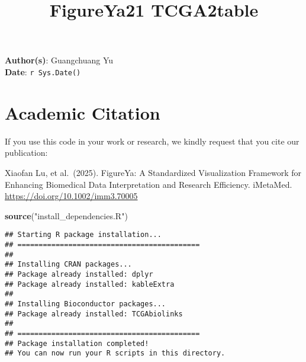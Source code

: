 \documentclass[
]{article}
\title{FigureYa21 TCGA2table}
\author{}
\date{\vspace{-2.5em}}
\newenvironment{Shaded}{\begin{snugshade}}{\end{snugshade}}
\newcommand{\FunctionTok}[1]{\textcolor[rgb]{0.13,0.29,0.53}{\textbf{#1}}}
\newcommand{\NormalTok}[1]{#1}
\newcommand{\StringTok}[1]{\textcolor[rgb]{0.31,0.60,0.02}{#1}}
\begin{document}
\maketitle

\textbf{Author(s)}: Guangchuang Yu\\
\textbf{Date}: \texttt{r\ Sys.Date()}

\section{Academic Citation}\label{academic-citation}

If you use this code in your work or research, we kindly request that
you cite our publication:

Xiaofan Lu, et al.~(2025). FigureYa: A Standardized Visualization
Framework for Enhancing Biomedical Data Interpretation and Research
Efficiency. iMetaMed. \url{https://doi.org/10.1002/imm3.70005}

\begin{Shaded}
\begin{Highlighting}[]
\FunctionTok{source}\NormalTok{(}\StringTok{"install\_dependencies.R"}\NormalTok{)}
\end{Highlighting}
\end{Shaded}

\begin{verbatim}
## Starting R package installation...
## ===========================================
## 
## Installing CRAN packages...
## Package already installed: dplyr 
## Package already installed: kableExtra 
## 
## Installing Bioconductor packages...
## Package already installed: TCGAbiolinks 
## 
## ===========================================
## Package installation completed!
## You can now run your R scripts in this directory.
\end{verbatim}
\end{document}
